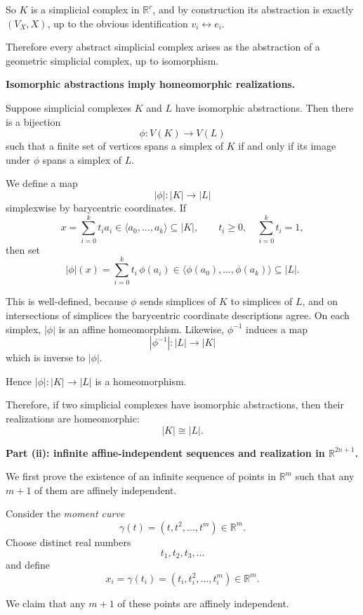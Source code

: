 \begin{solution}
So \(K\) is a simplicial complex in \(\mathbb R^r\), and by construction its abstraction is exactly \((V_X,X)\), up to the obvious identification \(v_i\leftrightarrow e_i\).

Therefore every abstract simplicial complex arises as the abstraction of a geometric simplicial complex, up to isomorphism.

\par

\textbf{Isomorphic abstractions imply homeomorphic realizations.}

Suppose simplicial complexes \(K\) and \(L\) have isomorphic abstractions. Then there is a bijection
\[
\phi:V(K)\to V(L)
\]
such that a finite set of vertices spans a simplex of \(K\) if and only if its image under \(\phi\) spans a simplex of \(L\).

We define a map
\[
|\phi|:|K|\to |L|
\]
simplexwise by barycentric coordinates. If
\[
x=\sum_{i=0}^k t_i a_i\in \langle a_0,\dots,a_k\rangle\subseteq |K|,
\qquad t_i\ge 0,\quad \sum_{i=0}^k t_i=1,
\]
then set
\[
|\phi|(x)=\sum_{i=0}^k t_i\,\phi(a_i)\in \langle \phi(a_0),\dots,\phi(a_k)\rangle\subseteq |L|.
\]

This is well-defined, because \(\phi\) sends simplices of \(K\) to simplices of \(L\), and on intersections of simplices the barycentric coordinate descriptions agree. On each simplex, \(|\phi|\) is an affine homeomorphism. Likewise, \(\phi^{-1}\) induces a map
\[
|\phi^{-1}|:|L|\to |K|
\]
which is inverse to \(|\phi|\).

Hence \(|\phi|:|K|\to |L|\) is a homeomorphism.

Therefore, if two simplicial complexes have isomorphic abstractions, then their realizations are homeomorphic:
\[
|K|\cong |L|.
\]

\par

\textbf{Part (ii): infinite affine-independent sequences and realization in \(\mathbb R^{2n+1}\).}

We first prove the existence of an infinite sequence of points in \(\mathbb R^m\) such that any \(m+1\) of them are affinely independent.

Consider the \emph{moment curve}
\[
\gamma(t)=(t,t^2,\dots,t^m)\in \mathbb R^m.
\]
Choose distinct real numbers
\[
t_1,t_2,t_3,\dots
\]
and define
\[
x_i=\gamma(t_i)=(t_i,t_i^2,\dots,t_i^m)\in \mathbb R^m.
\]

We claim that any \(m+1\) of these points are affinely independent.


\end{solution}
